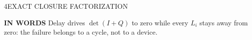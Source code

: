 {\begin{minipage}[t][\PosterRowHeight][t]{\PosterColWidth}
\begin{PosterPanel}{\PosterRowHeight}{4}{EXACT CLOSURE FACTORIZATION}
\begin{minipage}[c]{128mm}
\begin{tikzpicture}
      \end{tikzpicture}
    \end{minipage}\hfill%
    \begin{minipage}[c]{136mm}
      \begin{tcolorbox}[colback=IASPaleGold,colframe=IASGold,boxrule=0.8pt,arc=1.5mm,left=2mm,right=2mm,top=1mm,bottom=1mm]
        {\fontsize{22pt}{25pt}\selectfont\textbf{IN WORDS} Delay drives $\det(I+Q)$ to zero while every $L_i$ stays away from zero: the failure belongs to a cycle, not to a device.\par}
      \end{tcolorbox}
    \end{minipage}\par

  \end{PosterPanel}
\end{minipage}%
}%
\ifdefined\PosterFull
  \PosterSectionContent
  \let\PosterSectionFinish\relax
\else
  \def\PosterPageWidth{\PosterPreviewFullPageWidth}
  \def\PosterPageHeight{\PosterPreviewFourPageHeight}
  \def\PosterPreviewLeft{\PosterOuterMargin}
  
  \begin{frame}[t]
  \vspace*{\PosterPreviewTop}
  \noindent\hspace*{\PosterPreviewLeft}%
  \PosterSectionContent
  \end{frame}
  \def\PosterSectionFinish{}
\fi
\PosterSectionFinish
